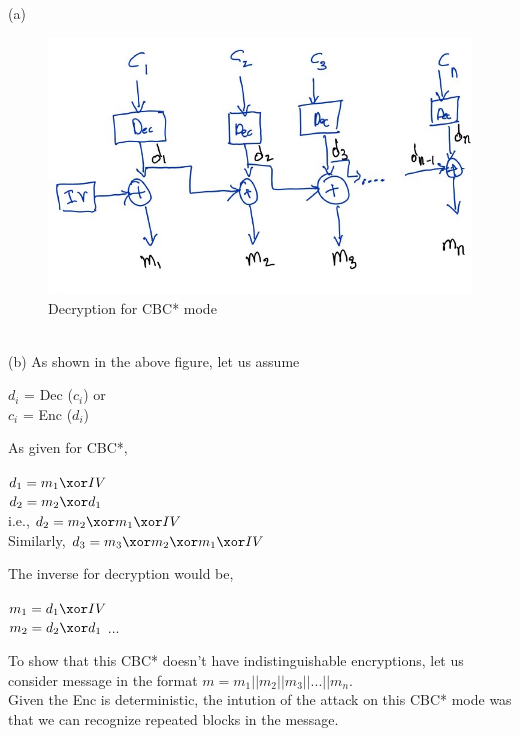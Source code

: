 (a)\\
\begin{figure}[h]
    \includegraphics[width=\textwidth,height=\textheight,keepaspectratio]{6-1 Fig1.jpg}
    \caption{Decryption for CBC* mode}
    \centering
\end{figure}\\
(b) As shown in the above figure, let us assume 

\begin{center}
    $d_i$ = Dec ($c_i$) or\\
    $c_i$ = Enc ($d_i$)
\end{center}

As given for CBC*, 

\begin{center}
    $d_1 = m_1 \xor IV $\\
    $d_2 = m_2 \xor d_1 $\\
    i.e., $d_2 = m_2 \xor m_1 \xor IV $\\
    Similarly, $d_3 = m_3 \xor m_2 \xor m_1 \xor IV $\\
\end{center}

The inverse for decryption would be, 

\begin{center}
    $m_1 = d_1 \xor IV $\\
    $m_2 = d_2 \xor d_1 $ ...
\end{center}



To show that this CBC* doesn't have indistinguishable encryptions, 
let us consider message in the format $m = m_1|| m_2||m_3|| ... ||m_n$.\\

Given the Enc is deterministic, the intution of the attack on this CBC* mode was that 
we can recognize repeated blocks in the message.\\

